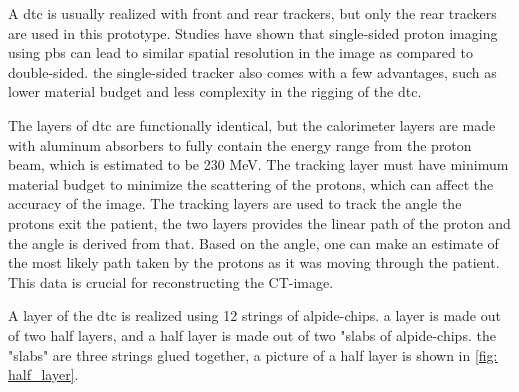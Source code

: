 \documentclass[main.tex]{subfiles}
\begin{document}
A \gls{dtc} is usually realized with front and rear trackers, but only the rear trackers are used in this prototype. Studies have shown that single-sided proton imaging using \gls{pbs} can lead to similar spatial resolution in the image as compared to double-sided\cite{pbs_result}. the single-sided tracker also comes with a few advantages, such as lower material budget and less complexity in the rigging of the \gls{dtc}.

The layers of \gls{dtc} are functionally identical, but the calorimeter layers are made with aluminum absorbers to fully contain the energy range from the proton beam, which is estimated to be 230 MeV. The tracking layer must have minimum material budget to minimize the scattering of the protons, which can affect the accuracy of the image. The tracking layers are used to track the angle the protons exit the patient, the two layers provides the linear path of the proton and the angle is derived from that. Based on the angle, one can make an estimate of the most likely path taken by the protons as it was moving through the patient. This data is crucial for reconstructing the CT-image.

A layer of the \gls{dtc} is realized using 12 strings of \gls{alpide}-chips. a layer is made out of two half layers, and a half layer is made out of two "slabs of \gls{alpide}-chips. the "slabs" are three strings glued together, a picture of a half layer is shown in \autoref{fig: half_layer}.
\end{document}

